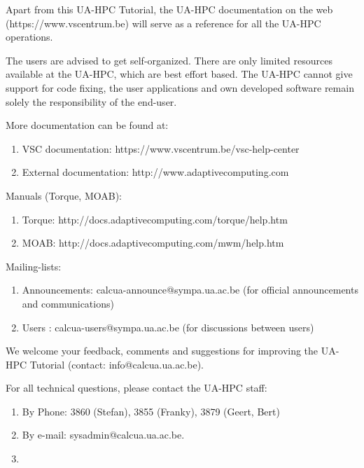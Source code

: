 Apart from this UA-HPC Tutorial, the UA-HPC documentation on the web (https://www.vscentrum.be) will serve as a reference for all the UA-HPC operations.


\textbf{} The users are advised to get self-organized. There are only limited resources available at the UA-HPC, which are best effort based. The UA-HPC cannot give support for code fixing, the user applications and own developed software remain solely the responsibility of the end-user.


More documentation can be found at:

\begin{enumerate}
\item  VSC documentation: https://www.vscentrum.be/vsc-help-center
\item  External documentation: http://www.adaptivecomputing.com
\end{enumerate}

Manuals (Torque, MOAB):

\begin{enumerate}
\item  Torque: http://docs.adaptivecomputing.com/torque/help.htm
\item  MOAB: http://docs.adaptivecomputing.com/mwm/help.htm
\end{enumerate}


Mailing-lists:

\begin{enumerate}
\item  Announcements: calcua-announce@sympa.ua.ac.be (for official announcements and communications)
\item  Users : calcua-users@sympa.ua.ac.be (for discussions between users)
\end{enumerate}

\textbf{}

We welcome your feedback, comments and suggestions for improving the UA-HPC Tutorial  (contact: info@calcua.ua.ac.be).


For all technical questions, please contact the UA-HPC staff:

\begin{enumerate}
\item  By Phone: 3860 (Stefan), 3855 (Franky), 3879 (Geert, Bert)
\item  By e-mail:  sysadmin@calcua.ua.ac.be.
\item  \eject
\end{enumerate}
